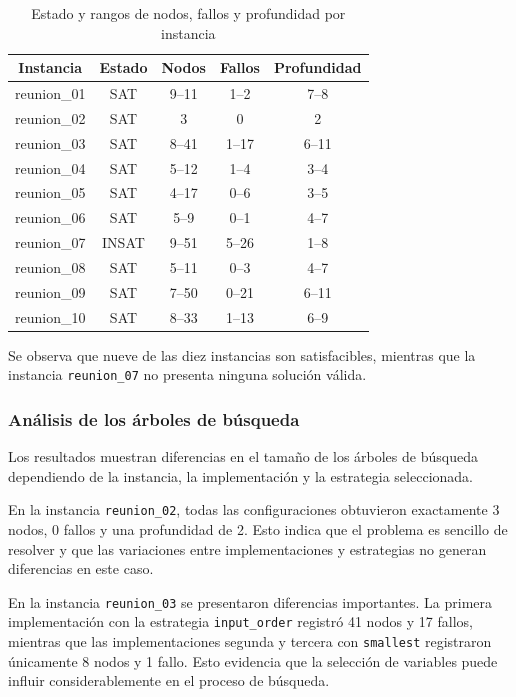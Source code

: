 \begin{table}[htbp]
\small
\caption{Estado y rangos de nodos, fallos y profundidad por instancia}
\label{tab:reunion-instancias}
\begin{tabular}{@{}ccccc@{}}
\toprule
\textbf{Instancia} & \textbf{Estado} & \textbf{Nodos} & \textbf{Fallos} & \textbf{Profundidad} \\
\midrule
reunion\_01 & SAT & 9--11 & 1--2 & 7--8 \\
reunion\_02 & SAT & 3 & 0 & 2 \\
reunion\_03 & SAT & 8--41 & 1--17 & 6--11 \\
reunion\_04 & SAT & 5--12 & 1--4 & 3--4 \\
reunion\_05 & SAT & 4--17 & 0--6 & 3--5 \\
reunion\_06 & SAT & 5--9 & 0--1 & 4--7 \\
reunion\_07 & INSAT & 9--51 & 5--26 & 1--8 \\
reunion\_08 & SAT & 5--11 & 0--3 & 4--7 \\
reunion\_09 & SAT & 7--50 & 0--21 & 6--11 \\
reunion\_10 & SAT & 8--33 & 1--13 & 6--9 \\
\bottomrule
\end{tabular}
\end{table}

Se observa que nueve de las diez instancias son satisfacibles, mientras que la instancia \texttt{reunion\_07} no presenta ninguna solución válida.

\subsubsection{Análisis de los árboles de búsqueda}

Los resultados muestran diferencias en el tamaño de los árboles de búsqueda dependiendo de la instancia, la implementación y la estrategia seleccionada.

En la instancia \texttt{reunion\_02}, todas las configuraciones obtuvieron exactamente 3 nodos, 0 fallos y una profundidad de 2. Esto indica que el problema es sencillo de resolver y que las variaciones entre implementaciones y estrategias no generan diferencias en este caso.

En la instancia \texttt{reunion\_03} se presentaron diferencias importantes. La primera implementación con la estrategia \texttt{input\_order} registró 41 nodos y 17 fallos, mientras que las implementaciones segunda y tercera con \texttt{smallest} registraron únicamente 8 nodos y 1 fallo. Esto evidencia que la selección de variables puede influir considerablemente en el proceso de búsqueda.


